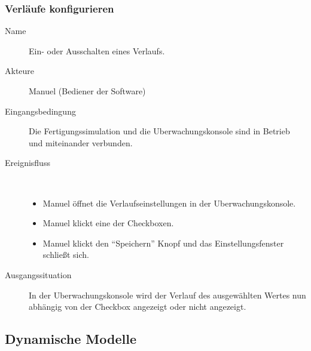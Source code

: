 \documentclass[parskip=full]{scrartcl}
\begin{document}
\subsubsection{Verläufe konfigurieren}
\begin{description}
  \item[Name] Ein- oder Ausschalten eines Verlaufs.
  \item[Akteure] Manuel (Bediener der Software)
  \item[Eingangsbedingung] Die \gls{Fertigungssimulation} und die \gls{Uberwachungskonsole} sind in Betrieb und miteinander verbunden.
  \item[Ereignisfluss]~\\
  \begin{itemize}[noitemsep]
    \item Manuel öffnet die Verlaufseinstellungen in der \gls{Uberwachungskonsole}.
    \item Manuel klickt eine der Checkboxen.
    \item Manuel klickt den "`Speichern"' Knopf und das Einstellungsfenster schließt sich.
  \end{itemize}
  \item[Ausgangssituation] In der \gls{Uberwachungskonsole} wird der Verlauf des ausgewählten Wertes nun abhängig von der Checkbox angezeigt oder nicht angezeigt.
\end{description}


\subsection{Dynamische Modelle}
\end{document}

